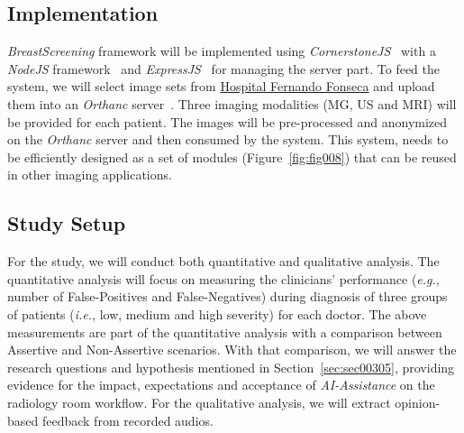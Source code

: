 \subsection{Implementation}
\label{sec:sec00402}

{\it BreastScreening} framework will be implemented using {\it CornerstoneJS}\footnotemark[3]~\cite{urban2017lesiontracker} with a {\it NodeJS} framework\footnotemark[4]~\cite{10.5555/3002437, drnasin2017javascript} and {\it ExpressJS}\footnotemark[5]~\cite{10.1117/12.2285952} for managing the server part.
To feed the system, we will select image sets from \hyperlink{https://hff.min-saude.pt/}{Hospital Fernando Fonseca} and upload them into an {\it Orthanc} server~\cite{Jodogne2018}.
Three imaging modalities (MG, US and MRI) will be provided for each patient.
The images will be pre-processed and anonymized on the {\it Orthanc} server and then consumed by the system.
This system, needs to be efficiently designed as a set of modules (Figure~\ref{fig:fig008}) that can be reused in other imaging applications.



\subsection{Study Setup}
\label{sec:sec00403}

For the study, we will conduct both quantitative and qualitative analysis.
The quantitative analysis will focus on measuring the clinicians' performance ({\it e.g.}, number of False-Positives and False-Negatives) during diagnosis of three groups of patients ({\it i.e.}, low, medium and high severity) for each doctor.
The above measurements are part of the quantitative analysis with a comparison between Assertive and Non-Assertive scenarios.
With that comparison, we will answer the  research questions and hypothesis mentioned in Section~\ref{sec:sec00305}, providing evidence for the impact, expectations and acceptance of {\it AI-Assistance} on the radiology room workflow.
For the qualitative analysis, we will extract opinion-based feedback from recorded audios.

